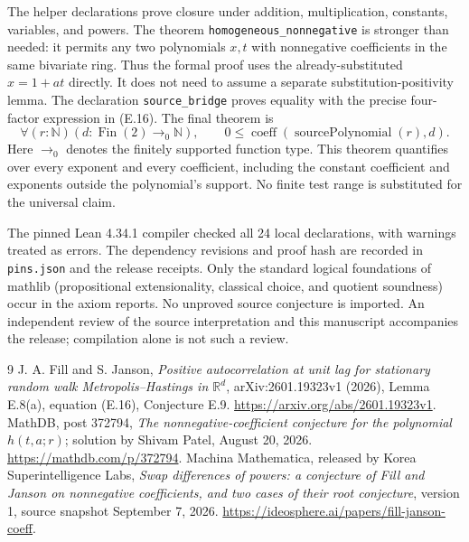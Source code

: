 \documentclass[11pt]{article}
\newcommand{\NN}{\mathbb N}
\begin{document}
The helper declarations prove closure under addition, multiplication, constants, variables, and powers. The theorem \texttt{homogeneous\_nonnegative} is stronger than needed: it permits any two polynomials $x,t$ with nonnegative coefficients in the same bivariate ring. Thus the formal proof uses the already-substituted $x=1+at$ directly. It does not need to assume a separate substitution-positivity lemma. The declaration \texttt{source\_bridge} proves equality with the precise four-factor expression in (E.16). The final theorem is
\[
\forall(r:\NN)(d:\operatorname{Fin}(2)\to_0\NN),\qquad
0\leq\operatorname{coeff}(\operatorname{sourcePolynomial}(r),d).
\]
Here $\to_0$ denotes the finitely supported function type. This theorem quantifies over every exponent and every coefficient, including the constant coefficient and exponents outside the polynomial's support. No finite test range is substituted for the universal claim.

The pinned Lean 4.34.1 compiler checked all 24 local declarations, with warnings treated as errors. The dependency revisions and proof hash are recorded in \texttt{pins.json} and the release receipts. Only the standard logical foundations of mathlib (propositional extensionality, classical choice, and quotient soundness) occur in the axiom reports. No unproved source conjecture is imported. An independent review of the source interpretation and this manuscript accompanies the release; compilation alone is not such a review.

\begin{thebibliography}{9}
 J. A. Fill and S. Janson, \emph{Positive autocorrelation at unit lag for stationary random walk Metropolis--Hastings in $\mathbb R^d$}, arXiv:2601.19323v1 (2026), Lemma E.8(a), equation (E.16), Conjecture E.9. \url{https://arxiv.org/abs/2601.19323v1}.
 MathDB, post 372794, \emph{The nonnegative-coefficient conjecture for the polynomial $h(t,a;r)$}; solution by Shivam Patel, August 20, 2026. \url{https://mathdb.com/p/372794}.
 Machina Mathematica, released by Korea Superintelligence Labs, \emph{Swap differences of powers: a conjecture of Fill and Janson on nonnegative coefficients, and two cases of their root conjecture}, version 1, source snapshot September 7, 2026. \url{https://ideosphere.ai/papers/fill-janson-coeff}.
\end{thebibliography}
\end{document}
